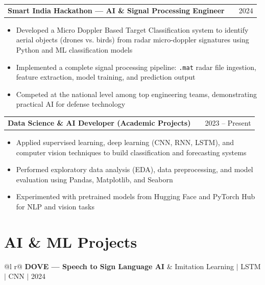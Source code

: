 \documentclass[a4paper,12pt]{article}
\makeatletter
\newenvironment{joblong}[2]
    {
    \begin{tabularx}{\linewidth}{@{}l X r@{}}
    \textbf{#1} & \hfill & #2 \\[2pt]
    \end{tabularx}
    \begin{minipage}[t]{\linewidth}
    \begin{itemize}[nosep,after=\strut, leftmargin=1em, itemsep=2pt,label=--]
    }
    {
    \end{itemize}
    \end{minipage}
    }
\makeatother
\begin{document}
\begin{joblong}{Smart India Hackathon --- AI \& Signal Processing Engineer}{2024}
\item Developed a Micro Doppler Based Target Classification system to identify aerial objects (drones vs. birds) from radar micro-doppler signatures using Python and ML classification models
\item Implemented a complete signal processing pipeline: \texttt{.mat} radar file ingestion, feature extraction, model training, and prediction output
\item Competed at the national level among top engineering teams, demonstrating practical AI for defense technology
\end{joblong}

\begin{joblong}{Data Science \& AI Developer (Academic Projects)}{2023 -- Present}
\item Applied supervised learning, deep learning (CNN, RNN, LSTM), and computer vision techniques to build classification and forecasting systems
\item Performed exploratory data analysis (EDA), data preprocessing, and model evaluation using Pandas, Matplotlib, and Seaborn
\item Experimented with pretrained models from Hugging Face and PyTorch Hub for NLP and vision tasks
\end{joblong}

\section{AI \& ML Projects}

\begin{tabularx}{\linewidth}{ @{}l r@{} }
\textbf{DOVE --- Speech to Sign Language AI} & \hfill Imitation Learning $|$ LSTM $|$ CNN $|$ 2024 \\[2pt]
 \\
\end{tabularx}
\end{document}
